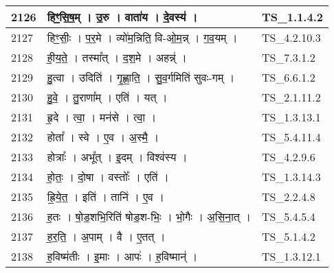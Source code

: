 \documentclass[17pt]{extarticle}
\begin{document}
\begin{longtable}{||p{0.4in}||p{4.9in}||p{0.9in}||}
    \hline
        
    2126 & हिꣳ॒॒सि॒ष॒म्   ।   उ॒रु   ।   वाता॑य   ।   दे॒वस्य॑   ।    & TS\_1.1.4.2       \\
    
    \hline
        
    2127 & हिꣳ॒॒सीः॒   ।   प॒र॒मे   ।   व्यो॑म॒न्निति॒ वि{-}ओ॒म॒न्न्   ।   ग॒व॒यम्   ।    & TS\_4.2.10.3       \\
    
    \hline
        
    2128 & ही॒य॒ते॒   ।   तस्मा᳚त्   ।   द॒श॒मे   ।   अहन्न्॑   ।    & TS\_7.3.1.2       \\
    
    \hline
        
    2129 & हु॒त्वा   ।   उदिति॑   ।   गृ॒ह्णा॒ति॒   ।   सु॒व॒र्गमिति॑ सुवः{-}गम्   ।    & TS\_6.6.1.2       \\
    
    \hline
        
    2130 & हु॒वे॒   ।   तु॒राणा᳚म्   ।   एति॑   ।   यत्   ।    & TS\_2.1.11.2       \\
    
    \hline
        
    2131 & हृ॒दे   ।   त्वा॒   ।   मन॑से   ।   त्वा॒   ।    & TS\_1.3.13.1       \\
    
    \hline
        
    2132 & होता᳚   ।   स्वे   ।   ए॒व   ।   अ॒स्मै॒   ।    & TS\_5.4.11.4       \\
    
    \hline
        
    2133 & होत्राः᳚   ।   अभू᳚त्   ।   इ॒दम्   ।   विश्व॑स्य   ।    & TS\_4.2.9.6       \\
    
    \hline
        
    2134 & हो॒तः॒   ।   दो॒षा   ।   वस्तोः᳚   ।   एति॑   ।    & TS\_1.3.14.3       \\
    
    \hline
        
    2135 & ह्रि॒ये॒त॒   ।   इति॑   ।   तानि॑   ।   ए॒व   ।    & TS\_2.2.4.8       \\
    
    \hline
        
    2136 & ह॒तः   ।   षो॒ड॒शभि॒रिति॑ षोड॒श{-}भिः॒   ।   भो॒गैः   ।   अ॒सि॒ना॒त्   ।    & TS\_5.4.5.4       \\
    
    \hline
        
    2137 & ह॒र॒ति॒   ।   अ॒पाम्   ।   वै   ।   ए॒तत्   ।    & TS\_5.1.4.2       \\
    
    \hline
        
    2138 & ह॒विष्म॑तीः   ।   इ॒माः   ।   आपः॑   ।   ह॒विष्मान्॑   ।    & TS\_1.3.12.1       \\
    
    \hline
        \bottomrule
  \end{longtable}
  
\end{document}
